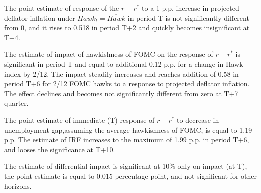 \documentclass[11pt]{article}
\begin{document}
  The point estimate of response of the $r-r^*$ to a 1 p.p. increase in projected deflator inflation under $\mathit{Hawk}_t=\overline{\mathit{Hawk}}$ in period T is not significantly different from 0, and it rises to 0.518 in period T+2 and quickly becomes insignificant at T+4.

  The estimate of impact of hawkishness of FOMC on the response of $r-r^*$ is significant in period T and equal to additional 0.12 p.p. for a change in Hawk index by 2/12. The impact steadily increases and reaches addition of 0.58 in period T+6 for 2/12 FOMC hawks to a response to projected deflator inflation. The effect declines and becomes not significantly different from zero at T+7 quarter.

  The point estimate of immediate (T) response of $r-r^*$ to decrease in unemployment gap,assuming the average hawkishness of FOMC, is equal to 1.19 p.p. The estimate of IRF increases to the maximum of 1.99 p.p. in period T+6, and looses the significance at T+10.
  
  The estimate of differential impact is significant at 10\% only on impact (at T), the point estimate is equal to 0.015 percentage point, and not significant for other horizons.
\end{document}
